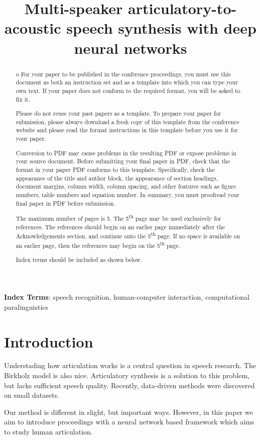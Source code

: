 \documentclass[a4paper]{article}
\title{Multi-speaker articulatory-to-acoustic speech synthesis with
deep neural networks}
\begin{document}
\maketitle
% 
\begin{abstract}o
  For your paper to be published in the conference proceedings, you must use this document as both an instruction set and as a template into which you can type your own text. If your paper does not conform to the required format, you will be asked to fix it.

  Please do not reuse your past papers as a template. To prepare your paper for submission, please always download a fresh copy of this template from the conference website and please read the format instructions in this template before you use it for your paper.

  Conversion to PDF may cause problems in the resulting PDF or expose problems in your source document. Before submitting your final paper in PDF, check that the format in your paper PDF conforms to this template. Specifically, check the appearance of the title and author block, the appearance of section headings, document margins, column width, column spacing, and other features such as figure numbers, table numbers and equation number. In summary, you must proofread your final paper in PDF before submission.
  
  The maximum number of pages is 5. The 5\textsuperscript{th} page may be used exclusively for references. The references should begin on an earlier page immediately after the Acknowledgements section, and continue onto the 5\textsuperscript{th} page. If no space is available on an earlier page, then the references may begin on the 5\textsuperscript{th} page.

  Index terms should be included as shown below.
\end{abstract}
\noindent\textbf{Index Terms}: speech recognition, human-computer interaction, computational paralinguistics

\section{Introduction}

Understading how articulation works is a central question in speech
research. The Birkholz model is also nice.
Articulatory synthesis is a solution to this problem, but
lacks sufficient speech quality. Recently, data-driven methods
were discovered on small datasets.

Our method is different in slight, but important ways.
However, in this paper we aim to introduce proceedings with a neural
network based framework which aims to study human articulation.
\end{document}
